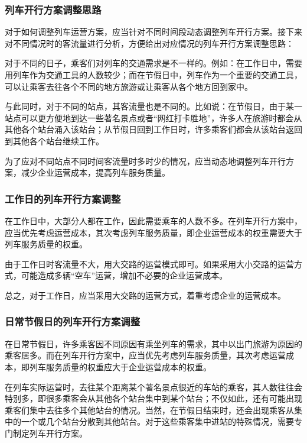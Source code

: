 \subsubsection{列车开行方案调整思路}

对于如何调整列车运营方案，应当针对不同时间段动态调整列车开行方案。接下来对不同情况时的客流量进行分析，方便给出对应情况的列车开行方案调整思路：

对于不同的日子，乘客们对列车的交通需求是不一样的。例如：在工作日中，需要用列车作为交通工具的人数较少；而在节假日中，列车作为一个重要的交通工具，可以让乘客去往各个不同的地方旅游或让乘客从各个地方回到家中。

与此同时，对于不同的站点，其客流量也是不同的。比如说：在节假日，由于某一站点可以更方便地到达一些著名景点或者“网红打卡胜地”，许多人在旅游时都会从其他各个站台涌入该站台；从节假日回到工作日时，许多乘客们都会从该站台返回到其他各个站台继续工作。

为了应对不同站点不同时间客流量时多时少的情况，应当动态地调整列车开行方案，减少企业运营成本，提高列车服务质量。

\subsubsection{工作日的列车开行方案调整}

在工作日中，大部分人都在工作，因此需要乘车的人数不多。在列车开行方案中，应当优先考虑运营成本，其次考虑列车服务质量，即企业运营成本的权重需要大于列车服务质量的权重。

由于工作日时客流量不大，用大交路的运营模式即可。如果采用大小交路的运营方式，可能造成多辆“空车”运营，增加不必要的企业运营成本。

总之，对于工作日，应当采用大交路的运营方式，着重考虑企业的运营成本。

\subsubsection{日常节假日的列车开行方案调整}

在日常节假日，许多乘客因不同原因有乘坐列车的需求，其中以出门旅游为原因的乘客居多。而在列车开行方案中，应当优先考虑列车服务质量，其次考虑运营成本，即列车服务质量的权重应大于企业运营成本的权重。

在列车实际运营时，去往某个距离某个著名景点很近的车站的乘客，其人数往往会特别多，即很多乘客会从其他各个站台集中到某个站台；不仅如此，还有可能出现乘客们集中去往多个其他站台的情况。当然，在节假日结束时，还会出现乘客从集中的一个或几个站台分散到其他站台。对于这些乘客集中进站的特殊情况，需要专门制定列车开行方案。

